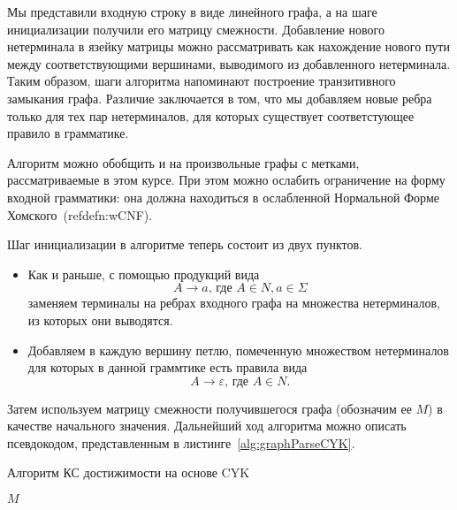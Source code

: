 Мы представили входную строку в виде линейного графа, а на шаге инициализации получили его матрицу смежности. Добавление нового нетерминала в язейку матрицы можно рассматривать как нахождение нового пути между соответствующими вершинами, выводимого из добавленного нетерминала. Таким образом, шаги алгоритма напоминают построение транзитивного замыкания графа. Различие заключается в том, что мы добавляем новые ребра только для тех пар нетерминалов, для которых существует соответстующее правило в грамматике.

Алгоритм можно обобщить и на произвольные графы с метками, рассматриваемые в этом курсе. При этом можно ослабить ограничение на форму входной грамматики: она должна находиться в ослабленной Нормальной Форме Хомского~(ref{defn:wCNF}).

Шаг инициализации в алгоритме теперь состоит из двух пунктов.
\begin{itemize}
\item Как и раньше, с помощью продукций вида \[A \to a \text{, где } A \in N, a \in \Sigma\]
заменяем терминалы на ребрах входного графа на множества нетерминалов, из которых они выводятся.
\item  Добавляем в каждую вершину петлю, помеченную множеством нетерминалов для которых в данной граммтике есть правила вида $$A \to \varepsilon\text{, где } A \in N.$$ 
\end{itemize}

 Затем используем матрицу смежности получившегося графа (обозначим ее $M$) в качестве начального значения. Дальнейший ход алгоритма можно описать псевдокодом, представленным в листинге~\ref{alg:graphParseCYK}.

\begin{algorithm}[H]
    \begin{algorithmic}[1]
        \caption{Алгоритм КС достижимости на основе CYK}
        \label{alg:graphParseCYK}

                        \EndIf
                    \EndFor
                \EndFor
            \EndFor
        \EndFor
        \EndWhile
        \State \Return $M$
        \EndFunction
    \end{algorithmic}
\end{algorithm}

